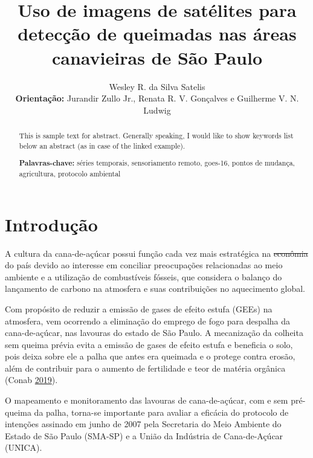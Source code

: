 \documentclass[11pt,brazil,]{article}
\title{\centering \LARGE Uso de imagens de satélites para detecção de queimadas
nas áreas canavieiras de São Paulo}
\author{\normalsize Wesley R. da Silva Satelis \\ \centering \normalsize \textbf{Orientação:} Jurandir Zullo Jr., Renata
R. V. Gonçalves e Guilherme V. N. Ludwig}
\date{}
\providecommand{\DIFaddtex}[1]{{\protect\color{blue}\uwave{#1}}} %
\providecommand{\DIFdeltex}[1]{{\protect\color{red}\sout{#1}}}                      %
\providecommand{\DIFaddbegin}{} %
\providecommand{\DIFaddend}{} %
\providecommand{\DIFdelbegin}{} %
\providecommand{\DIFdelend}{} %
\providecommand{\DIFadd}[1]{\texorpdfstring{\DIFaddtex{#1}}{#1}} %
\providecommand{\DIFdel}[1]{\texorpdfstring{\DIFdeltex{#1}}{}} %
\newcommand{\DIFscaledelfig}{0.5}
\newlength{\DIFdelgraphicswidth} %
\newlength{\DIFdelgraphicsheight} %
\newcommand{\DIFaddincludegraphics}[2][]{{\color{blue}\fbox{\DIFOincludegraphics[#1]{#2}}}} %
\newcommand{\DIFdelincludegraphics}[2][]{%
\sbox{\DIFdelgraphicsbox}{\DIFOincludegraphics[#1]{#2}}%
\settoboxwidth{\DIFdelgraphicswidth}{\DIFdelgraphicsbox} %
\settoboxtotalheight{\DIFdelgraphicsheight}{\DIFdelgraphicsbox} %
\scalebox{\DIFscaledelfig}{%
\parbox[b]{\DIFdelgraphicswidth}{\usebox{\DIFdelgraphicsbox}\\[-\baselineskip] \rule{\DIFdelgraphicswidth}{0em}}\llap{\resizebox{\DIFdelgraphicswidth}{\DIFdelgraphicsheight}{%
\setlength{\unitlength}{\DIFdelgraphicswidth}%
\begin{picture}(1,1)%
\thicklines\linethickness{2pt} %
{\color[rgb]{1,0,0}\put(0,0){\framebox(1,1){}}}%
{\color[rgb]{1,0,0}\put(0,0){\line( 1,1){1}}}%
{\color[rgb]{1,0,0}\put(0,1){\line(1,-1){1}}}%
\end{picture}%
}\hspace*{3pt}}} %
} %
\DeclareRobustCommand{\DIFaddbegin}{\DIFOaddbegin \let\includegraphics\DIFaddincludegraphics} %
\DeclareRobustCommand{\DIFaddend}{\DIFOaddend \let\includegraphics\DIFOincludegraphics} %
\DeclareRobustCommand{\DIFdelbegin}{\DIFOdelbegin \let\includegraphics\DIFdelincludegraphics} %
\DeclareRobustCommand{\DIFdelend}{\DIFOaddend \let\includegraphics\DIFOincludegraphics} %
\begin{document}
\maketitle
\begin{abstract}
This is sample text for abstract. Generally speaking, I would like to
show keywords list below an abstract (as in case of the linked example).

\par

\textbf{Palavras-chave:} séries temporais, sensoriamento remoto,
goes-16, pontos de mudança, agricultura, protocolo ambiental
\end{abstract}

\renewcommand{\figurename}{Figura}
\renewcommand{\tablename}{Tabela}
\captionsetup[figure]{font=small}

\hypertarget{introducao}{%
\section{Introdução}\label{introducao}}

A cultura da cana-de-açúcar possui função cada vez mais estratégica na
\DIFdelbegin \DIFdel{econômia }\DIFdelend \DIFaddbegin \DIFadd{economia }\DIFaddend do país devido ao interesse em conciliar preocupações
relacionadas ao meio ambiente e a utilização de combustíveis fósseis,
que considera o balanço do lançamento de carbono na atmosfera e suas
contribuições no aquecimento global.

Com propósito de reduzir a emissão de gases de efeito estufa (GEEs) na
atmosfera, vem ocorrendo a eliminação do emprego de fogo para despalha
da cana-de-açúcar, nas lavouras do estado de São Paulo. A mecanização da
colheita sem queima prévia evita a emissão de gases de efeito estufa e
beneficia o solo, pois deixa sobre ele a palha que antes era queimada e
o protege contra erosão, além de contribuir para o aumento de
fertilidade e teor de matéria orgânica (Conab
\protect\hyperlink{ref-conab}{2019}).

O mapeamento e monitoramento das lavouras de cana-de-açúcar, com e sem
pré-queima da palha, torna-se importante para avaliar a eficácia do
protocolo de intenções assinado em junho de 2007 pela Secretaria do Meio
Ambiente do Estado de São Paulo (SMA-SP) e a União da Indústria de
Cana-de-Açúcar (UNICA).
\end{document}
